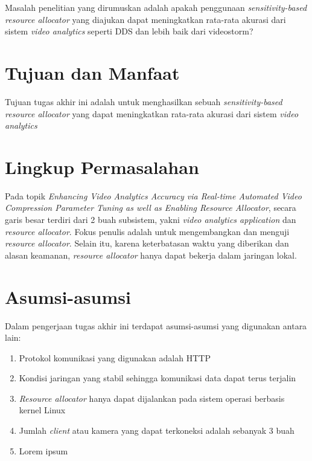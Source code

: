 Masalah penelitian yang dirumuskan adalah apakah penggunaan \textit{sensitivity-based resource allocator} yang diajukan dapat meningkatkan 
rata-rata akurasi dari sistem \textit{video analytics} seperti DDS dan lebih baik dari videostorm?
\section{Tujuan dan Manfaat}

Tujuan tugas akhir ini adalah untuk menghasilkan sebuah \textit{sensitivity-based resource allocator} yang dapat meningkatkan
rata-rata akurasi dari sistem \textit{video analytics}

\section{Lingkup Permasalahan}

Pada topik \textit{Enhancing Video Analytics Accuracy via
Real-time Automated Video Compression Parameter Tuning as
well as Enabling Resource Allocator}, secara garis besar terdiri dari 2 buah subsistem, yakni \textit{video analytics application} dan \textit{resource allocator}.
Fokus penulis adalah untuk mengembangkan dan menguji \textit{resource allocator}. 
Selain itu, karena keterbatasan waktu yang diberikan dan alasan keamanan,
\textit{resource allocator} hanya dapat bekerja dalam jaringan lokal.


\section{Asumsi-asumsi}

Dalam pengerjaan tugas akhir ini terdapat asumsi-asumsi yang digunakan antara lain:

\begin{enumerate}
	\item Protokol komunikasi yang digunakan adalah HTTP
	\item Kondisi jaringan yang stabil sehingga komunikasi data dapat terus terjalin
	\item \textit{Resource allocator} hanya dapat dijalankan pada sistem operasi berbasis kernel Linux
	\item Jumlah \textit{client} atau kamera yang dapat terkoneksi adalah sebanyak 3 buah
	\item Lorem ipsum
\end{enumerate}

